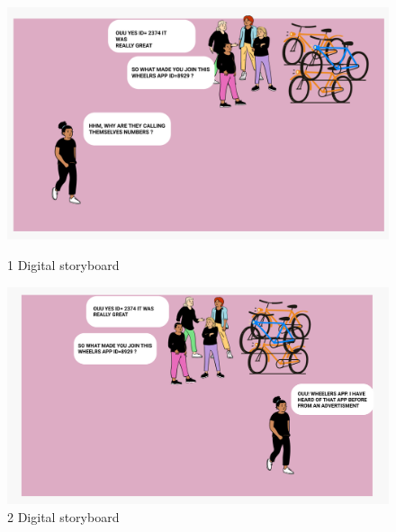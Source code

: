 \documentclass{l4proj}
\begin{document}
\begin{figure}
 \centering
 \begin{minipage}[b]{0.55\textwidth}
  \includegraphics[width=1\textwidth]{images/1.png}
  \caption{ 1 Digital storyboard}
 \end{minipage}%
 \begin{minipage}[b]{0.55\textwidth}
  \includegraphics[width=1\textwidth]{images/2.png}
  \caption{2 Digital storyboard}
 \end{minipage}
\end{figure}
\end{document}
